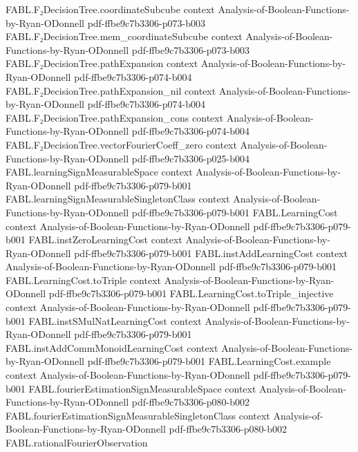 \begin{theorem}
\proofstep
  {FABL.F₂DecisionTree.coordinateSubcube}
  {context}
  {Analysis-of-Boolean-Functions-by-Ryan-ODonnell}
  {pdf-ffbe9c7b3306-p073-b003}
\proofstep
  {FABL.F₂DecisionTree.mem_coordinateSubcube}
  {context}
  {Analysis-of-Boolean-Functions-by-Ryan-ODonnell}
  {pdf-ffbe9c7b3306-p073-b003}
\proofstep
  {FABL.F₂DecisionTree.pathExpansion}
  {context}
  {Analysis-of-Boolean-Functions-by-Ryan-ODonnell}
  {pdf-ffbe9c7b3306-p074-b004}
\proofstep
  {FABL.F₂DecisionTree.pathExpansion_nil}
  {context}
  {Analysis-of-Boolean-Functions-by-Ryan-ODonnell}
  {pdf-ffbe9c7b3306-p074-b004}
\proofstep
  {FABL.F₂DecisionTree.pathExpansion_cons}
  {context}
  {Analysis-of-Boolean-Functions-by-Ryan-ODonnell}
  {pdf-ffbe9c7b3306-p074-b004}
\proofstep
  {FABL.F₂DecisionTree.vectorFourierCoeff_zero}
  {context}
  {Analysis-of-Boolean-Functions-by-Ryan-ODonnell}
  {pdf-ffbe9c7b3306-p025-b004}
\proofstep
  {FABL.learningSignMeasurableSpace}
  {context}
  {Analysis-of-Boolean-Functions-by-Ryan-ODonnell}
  {pdf-ffbe9c7b3306-p079-b001}
\proofstep
  {FABL.learningSignMeasurableSingletonClass}
  {context}
  {Analysis-of-Boolean-Functions-by-Ryan-ODonnell}
  {pdf-ffbe9c7b3306-p079-b001}
\proofstep
  {FABL.LearningCost}
  {context}
  {Analysis-of-Boolean-Functions-by-Ryan-ODonnell}
  {pdf-ffbe9c7b3306-p079-b001}
\proofstep
  {FABL.instZeroLearningCost}
  {context}
  {Analysis-of-Boolean-Functions-by-Ryan-ODonnell}
  {pdf-ffbe9c7b3306-p079-b001}
\proofstep
  {FABL.instAddLearningCost}
  {context}
  {Analysis-of-Boolean-Functions-by-Ryan-ODonnell}
  {pdf-ffbe9c7b3306-p079-b001}
\proofstep
  {FABL.LearningCost.toTriple}
  {context}
  {Analysis-of-Boolean-Functions-by-Ryan-ODonnell}
  {pdf-ffbe9c7b3306-p079-b001}
\proofstep
  {FABL.LearningCost.toTriple_injective}
  {context}
  {Analysis-of-Boolean-Functions-by-Ryan-ODonnell}
  {pdf-ffbe9c7b3306-p079-b001}
\proofstep
  {FABL.instSMulNatLearningCost}
  {context}
  {Analysis-of-Boolean-Functions-by-Ryan-ODonnell}
  {pdf-ffbe9c7b3306-p079-b001}
\proofstep
  {FABL.instAddCommMonoidLearningCost}
  {context}
  {Analysis-of-Boolean-Functions-by-Ryan-ODonnell}
  {pdf-ffbe9c7b3306-p079-b001}
\proofstep
  {FABL.LearningCost.example}
  {context}
  {Analysis-of-Boolean-Functions-by-Ryan-ODonnell}
  {pdf-ffbe9c7b3306-p079-b001}
\proofstep
  {FABL.fourierEstimationSignMeasurableSpace}
  {context}
  {Analysis-of-Boolean-Functions-by-Ryan-ODonnell}
  {pdf-ffbe9c7b3306-p080-b002}
\proofstep
  {FABL.fourierEstimationSignMeasurableSingletonClass}
  {context}
  {Analysis-of-Boolean-Functions-by-Ryan-ODonnell}
  {pdf-ffbe9c7b3306-p080-b002}
\proofstep
  {FABL.rationalFourierObservation}

\end{theorem}
